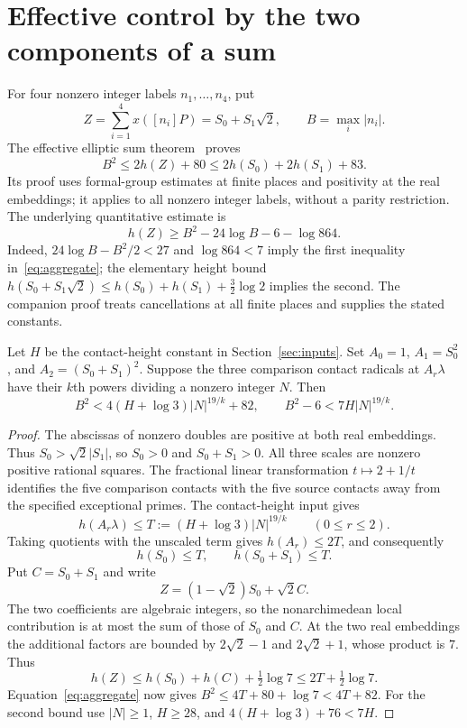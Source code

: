 \documentclass[11pt,a4paper]{article}
\begin{document}
\section{Effective control by the two components of a sum}

For four nonzero integer labels $n_1,\ldots,n_4$, put
\[
 Z=\sum_{i=1}^4x([n_i]P)=S_0+S_1\sqrt2,
 \qquad B=\max_i|n_i|.
\]
The effective elliptic sum theorem~\cite{Effective} proves
\begin{equation}\label{eq:aggregate}
                 B^2\le2h(Z)+80
                    \le2h(S_0)+2h(S_1)+83.
\end{equation}
Its proof uses formal-group estimates at finite places and positivity
at the real embeddings; it applies to all nonzero integer labels,
without a parity restriction. The underlying quantitative estimate is
\[
 h(Z)\ge B^2-24\log B-6-\log864.
\]
Indeed, $24\log B-B^2/2<27$ and $\log864<7$ imply the
first inequality in~\eqref{eq:aggregate}; the elementary height bound
$h(S_0+S_1\sqrt2)\le h(S_0)+h(S_1)+\tfrac32\log2$
implies the second. The companion proof treats cancellations at
all finite places and supplies the stated constants.

\begin{lemma}\label{lem:detector-height}
Let $H$ be the contact-height constant in Section~\ref{sec:inputs}.
Set $A_0=1$, $A_1=S_0^2$, and $A_2=(S_0+S_1)^2$.
Suppose the three comparison contact radicals at $A_r\lambda$
have their $k$th powers dividing a nonzero integer $N$.
Then
\begin{equation}\label{eq:commonheight}
 B^2<4(H+\log3)|N|^{19/k}+82,
 \qquad B^2-6<7H|N|^{19/k}.
\end{equation}
\end{lemma}
\begin{proof}
The abscissas of nonzero doubles are positive at both real
embeddings. Thus $S_0>\sqrt2|S_1|$, so $S_0>0$ and
$S_0+S_1>0$. All three scales are nonzero positive rational squares.
The fractional linear transformation $t\mapsto2+1/t$ identifies
the five comparison contacts with the five source contacts away
from the specified exceptional primes. The contact-height input gives
\[
 h(A_r\lambda)\le T:=(H+\log3)|N|^{19/k}\qquad(0\le r\le2).
\]
Taking quotients with the unscaled term gives $h(A_r)\le2T$,
and consequently
\[
                      h(S_0)\le T,\qquad h(S_0+S_1)\le T.
\]
Put $C=S_0+S_1$ and write
\[
                   Z=(1-\sqrt2)S_0+\sqrt2 C.
\]
The two coefficients are algebraic integers, so the nonarchimedean
local contribution is at most the sum of those of $S_0$ and $C$.
At the two real embeddings the additional factors are bounded by
$2\sqrt2-1$ and $2\sqrt2+1$, whose product is $7$. Thus
\[
                   h(Z)\le h(S_0)+h(C)+\tfrac12\log7
                              \le2T+\tfrac12\log7.
\]
Equation~\eqref{eq:aggregate} now gives
$B^2\le4T+80+\log7<4T+82$.
For the second bound use $|N|\ge1$, $H\ge28$, and
$4(H+\log3)+76<7H$.
\end{proof}
\end{document}
